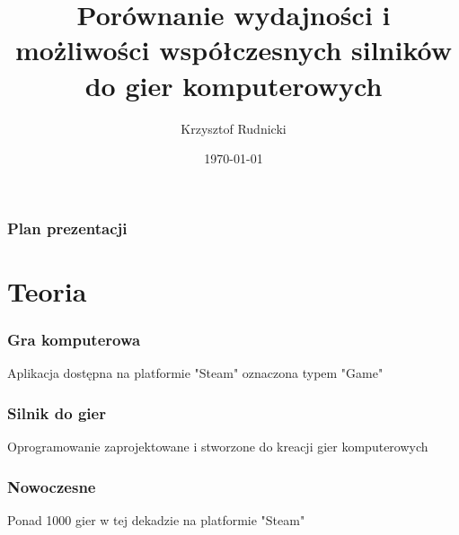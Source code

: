 \documentclass{beamer}
\title{\large Porównanie wydajności i możliwości współczesnych silników do gier komputerowych}
\author{Krzysztof Rudnicki}
\institute{
    \textbf{Promotor} \\
    dr inż. Michał Chwesiuk
}
\date{\scriptsize \today} %
\begin{document}
\begin{frame}
  \vspace{-0.5cm} %
  \maketitle
\end{frame}

\begin{frame}
\frametitle{Plan prezentacji}
\tableofcontents
\end{frame}

\section{Teoria}
\begin{frame}
  \frametitle{Gra komputerowa}
  \large Aplikacja dostępna na platformie "Steam" oznaczona typem "Game"
\end{frame}
\begin{frame}
\frametitle{Silnik do gier}
\large Oprogramowanie zaprojektowane i stworzone do kreacji gier komputerowych
\end{frame}

\begin{frame}
  \frametitle{Nowoczesne}
  \large Ponad 1000 gier w tej dekadzie na platformie "Steam"
\end{frame}


{
\begin{frame}
\end{frame}
}
\end{document}
